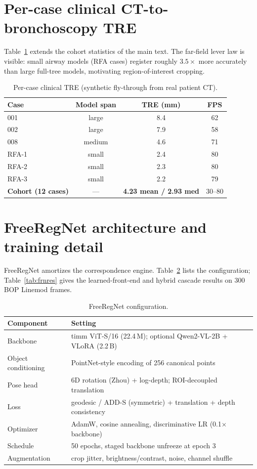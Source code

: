 \documentclass[10pt]{article}
\begin{document}
\section{Per-case clinical CT-to-bronchoscopy TRE}
Table~\ref{tab:percase} extends the cohort statistics of the main text. The
far-field lever law is visible: small airway models (RFA cases) register
roughly $3.5\times$ more accurately than large full-tree models, motivating
region-of-interest cropping.

\begin{table}[h]
\centering
\caption{Per-case clinical TRE (synthetic fly-through from real patient CT).}
\label{tab:percase}
\begin{tabular}{lccc}
\toprule
Case & Model span & TRE (mm) & FPS \\
\midrule
001 & large & 8.4 & 62 \\
002 & large & 7.9 & 58 \\
008 & medium & 4.6 & 71 \\
RFA-1 & small & 2.4 & 80 \\
RFA-2 & small & 2.3 & 80 \\
RFA-3 & small & 2.2 & 79 \\
\midrule
\textbf{Cohort (12 cases)} & --- & \textbf{4.23 mean / 2.93 med} & 30--80 \\
\bottomrule
\end{tabular}
\end{table}

\section{FreeRegNet architecture and training detail}
FreeRegNet amortizes the correspondence engine. Table~\ref{tab:frn} lists the
configuration; Table~\ref{tab:frnres} gives the learned-front-end and hybrid
cascade results on 300 BOP Linemod frames.

\begin{table}[h]
\centering
\caption{FreeRegNet configuration.}
\label{tab:frn}
\begin{tabular}{ll}
\toprule
Component & Setting \\
\midrule
Backbone & timm ViT-S/16 (22.4\,M); optional Qwen2-VL-2B + VLoRA (2.2\,B) \\
Object conditioning & PointNet-style encoding of 256 canonical points \\
Pose head & 6D rotation (Zhou) + log-depth; ROI-decoupled translation \\
Loss & geodesic / ADD-S (symmetric) + translation + depth consistency \\
Optimizer & AdamW, cosine annealing, discriminative LR (0.1$\times$ backbone) \\
Schedule & 50 epochs, staged backbone unfreeze at epoch 3 \\
Augmentation & crop jitter, brightness/contrast, noise, channel shuffle \\
\bottomrule
\end{tabular}
\end{table}
\end{document}
